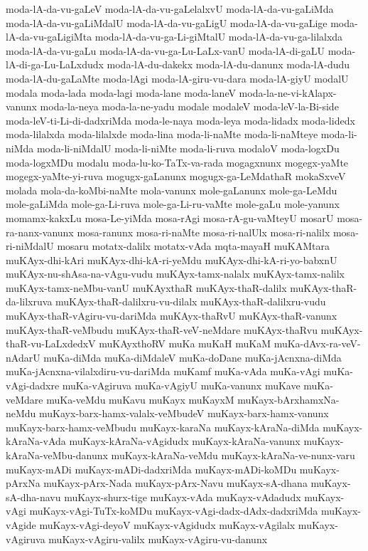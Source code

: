 {moda-lA-da-vu-gaLeV
moda-lA-da-vu-gaLelalxvU
moda-lA-da-vu-gaLiMda
moda-lA-da-vu-gaLiMdalU
moda-lA-da-vu-gaLigU
moda-lA-da-vu-gaLige
moda-lA-da-vu-gaLigiMta
moda-lA-da-vu-ga-Li-giMtalU
moda-lA-da-vu-ga-lilalxda
moda-lA-da-vu-gaLu
moda-lA-da-vu-ga-Lu-LaLx-vanU
moda-lA-di-gaLU
moda-lA-di-ga-Lu-LaLxdudx
moda-lA-du-dakekx
moda-lA-du-danunx
moda-lA-dudu
moda-lA-du-gaLaMte
moda-lAgi
moda-lA-giru-vu-dara
moda-lA-giyU
modalU
modala
moda-lada
moda-lagi
moda-lane
moda-laneV
moda-la-ne-vi-kAlapx-vanunx
moda-la-neya
moda-la-ne-yadu
modale
modaleV
moda-leV-la-Bi-side
moda-leV-ti-Li-di-dadxriMda
moda-le-naya
moda-leya
moda-lidadx
moda-lidedx
moda-lilalxda
moda-lilalxde
moda-lina
moda-li-naMte
moda-li-naMteye
moda-li-niMda
moda-li-niMdalU
moda-li-niMte
moda-li-ruva
modaloV
moda-logxDu
moda-logxMDu
modalu
moda-lu-ko-TaTx-va-rada
mogagxnunx
mogegx-yaMte
mogegx-yaMte-yi-ruva
mogugx-gaLanunx
mogugx-ga-LeMdathaR
mokaSxveV
molada
mola-da-koMbi-naMte
mola-vanunx
mole-gaLanunx
mole-ga-LeMdu
mole-gaLiMda
mole-ga-Li-ruva
mole-ga-Li-ru-vaMte
mole-gaLu
mole-yanunx
momamx-kakxLu
mosa-Le-yiMda
mosa-rAgi
mosa-rA-gu-vaMteyU
mosarU
mosa-ra-nanx-vanunx
mosa-ranunx
mosa-ri-naMte
mosa-ri-nalUlx
mosa-ri-nalilx
mosa-ri-niMdalU
mosaru
motatx-dalilx
motatx-vAda
mqta-mayaH
muKAMtara
muKAyx-dhi-kAri
muKAyx-dhi-kA-ri-yeMdu
muKAyx-dhi-kA-ri-yo-babxnU
muKAyx-nu-shAsa-na-vAgu-vudu
muKAyx-tamx-nalalx
muKAyx-tamx-nalilx
muKAyx-tamx-neMbu-vanU
muKAyxthaR
muKAyx-thaR-dalilx
muKAyx-thaR-da-lilxruva
muKAyx-thaR-dalilxru-vu-dilalx
muKAyx-thaR-dalilxru-vudu
muKAyx-thaR-vAgiru-vu-dariMda
muKAyx-thaRvU
muKAyx-thaR-vanunx
muKAyx-thaR-veMbudu
muKAyx-thaR-veV-neMdare
muKAyx-thaRvu
muKAyx-thaR-vu-LaLxdedxV
muKAyxthoRV
muKa
muKaH
muKaM
muKa-dAvx-ra-veV-nAdarU
muKa-diMda
muKa-diMdaleV
muKa-doDane
muKa-jAcnxna-diMda
muKa-jAcnxna-vilalxdiru-vu-dariMda
muKamf
muKa-vAda
muKa-vAgi
muKa-vAgi-dadxre
muKa-vAgiruva
muKa-vAgiyU
muKa-vanunx
muKave
muKa-veMdare
muKa-veMdu
muKavu
muKayx
muKayxM
muKayx-bArxhamxNa-neMdu
muKayx-barx-hamx-valalx-veMbudeV
muKayx-barx-hamx-vanunx
muKayx-barx-hamx-veMbudu
muKayx-karaNa
muKayx-kAraNa-diMda
muKayx-kAraNa-vAda
muKayx-kAraNa-vAgidudx
muKayx-kAraNa-vanunx
muKayx-kAraNa-veMbu-danunx
muKayx-kAraNa-veMdu
muKayx-kAraNa-ve-nunx-varu
muKayx-mADi
muKayx-mADi-dadxriMda
muKayx-mADi-koMDu
muKayx-pArxNa
muKayx-pArx-Nada
muKayx-pArx-Navu
muKayx-sA-dhana
muKayx-sA-dha-navu
muKayx-shurx-tige
muKayx-vAda
muKayx-vAdadudx
muKayx-vAgi
muKayx-vAgi-TuTx-koMDu
muKayx-vAgi-dadx-dAdx-dadxriMda
muKayx-vAgide
muKayx-vAgi-deyoV
muKayx-vAgidudx
muKayx-vAgilalx
muKayx-vAgiruva
muKayx-vAgiru-valilx
muKayx-vAgiru-vu-danunx
}
